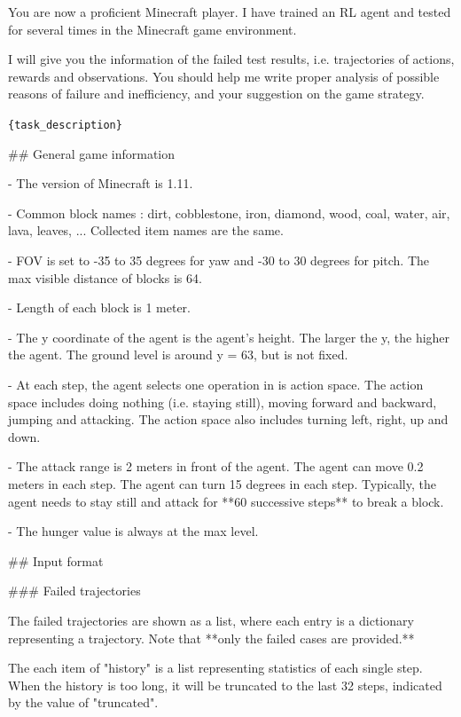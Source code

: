 

You are now a proficient Minecraft player. I have trained an RL agent and tested for several times in the Minecraft game environment. 

I will give you the information of the failed test results, i.e. trajectories of actions, rewards and observations. You should help me write proper analysis of possible reasons of failure and inefficiency, and your suggestion on the game strategy. 



\texttt{\{task\_description\}}



\#\# General game information

- The version of Minecraft is 1.11.

- Common block names : dirt, cobblestone, iron, diamond, wood, coal, water, air, lava, leaves, ... Collected item names are the same.

- FOV is set to -35 to 35 degrees for yaw and -30 to 30 degrees for pitch. The max visible distance of blocks is 64.

- Length of each block is 1 meter.

- The y coordinate of the agent is the agent's height. The larger the y, the higher the agent. The ground level is around y = 63, but is not fixed.

- At each step, the agent selects one operation in is action space. The action space includes doing nothing (i.e. staying still), moving forward and backward, jumping and attacking. The action space also includes turning left, right, up and down. 

- The attack range is 2 meters in front of the agent. The agent can move 0.2 meters in each step. The agent can turn 15 degrees in each step. Typically, the agent needs to stay still and attack for **60 successive steps** to break a block.

- The hunger value is always at the max level.





\#\# Input format

\#\#\# Failed trajectories

The failed trajectories are shown as a list, where each entry is a dictionary representing a trajectory. Note that **only the failed cases are provided.**

The each item of "history" is a list representing statistics of each single step.  When the history is too long, it will be truncated to the last 32 steps, indicated by the value of "truncated".

